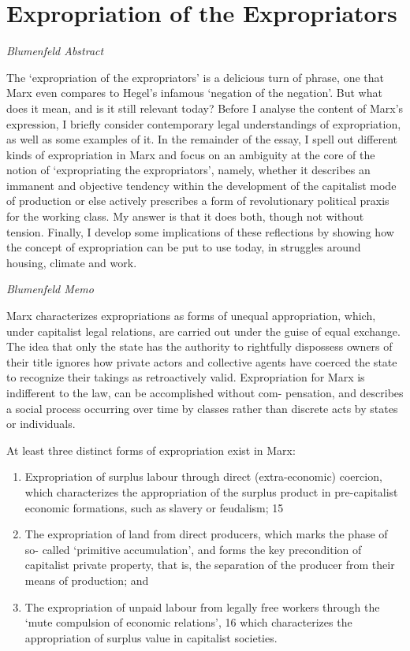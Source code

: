 \documentclass[
]{book}
\begin{document}
\hypertarget{expropriation-of-the-expropriators}{%
\section{Expropriation of the Expropriators}\label{expropriation-of-the-expropriators}}

\emph{Blumenfeld Abstract}

The `expropriation of the expropriators' is a delicious turn of phrase, one that Marx even compares to Hegel's infamous `negation of the negation'. But what does it mean, and is it still relevant today? Before I analyse the content of Marx's expression, I briefly consider contemporary legal understandings of expropriation, as well as some examples of it. In the remainder of the essay, I spell out different kinds of expropriation in Marx and focus on an ambiguity at the core of the notion of `expropriating the expropriators', namely, whether it describes an immanent and objective tendency within the development of the capitalist mode of production or else actively prescribes a form of revolutionary political praxis for the working class. My answer is that it does both, though not without tension. Finally, I develop some implications of these reflections by showing how the concept of expropriation can be put to use today, in struggles around housing, climate and work.

\emph{Blumenfeld Memo}

Marx characterizes expropriations as forms of unequal appropriation, which,
under capitalist legal relations, are carried out under the guise of equal exchange.
The idea that only the state has the authority to rightfully dispossess owners of
their title ignores how private actors and collective agents
have coerced the state to recognize their takings as retroactively valid.
Expropriation for Marx is indifferent to the law, can be accomplished without com-
pensation, and describes a social process occurring over time by classes rather than
discrete acts by states or individuals.

At least three distinct forms of expropriation exist in Marx:

\begin{enumerate}
\def\labelenumi{\arabic{enumi}.}
\item
  Expropriation of surplus labour through direct (extra-economic) coercion, which
  characterizes the appropriation of the surplus product in pre-capitalist economic
  formations, such as slavery or feudalism; 15
\item
  The expropriation of land from direct producers, which marks the phase of so-
  called `primitive accumulation', and forms the key precondition of capitalist
  private property, that is, the separation of the producer from their means of
  production; and
\item
  The expropriation of unpaid labour from legally free workers through the `mute
  compulsion of economic relations', 16 which characterizes the appropriation of
  surplus value in capitalist societies.
\end{enumerate}
\end{document}
